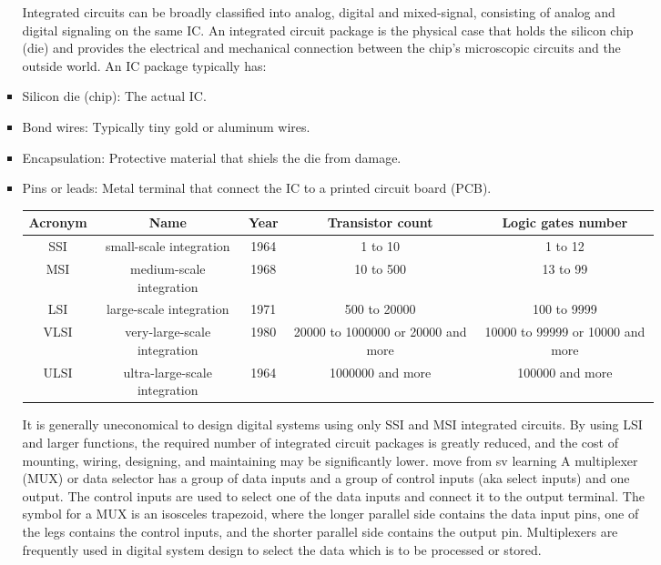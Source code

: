 \documentclass[a4paper,12pt]{article}
\begin{document}
\begin{itemize}
\begin{itemize}
\begin{itemize}
\begin{itemize}
\begin{itemize}
\begin{itemize}
\begin{itemize}
Integrated circuits can be broadly classified into analog, digital and mixed-signal, consisting of analog and digital signaling on the same IC.
An integrated circuit package is the physical case that holds the silicon chip (die) and provides the electrical and mechanical connection between the chip’s microscopic circuits and the outside world. An IC package typically has:
\bit
\item Silicon die (chip): The actual IC.
\item Bond wires: Typically tiny gold or aluminum wires.
\item Encapsulation: Protective material that shiels the die from damage.
\item Pins or leads: Metal terminal that connect the IC to a printed circuit board (PCB).
\eit
{}
\begin{longtable}[c]{|c|c|c|c|c|}
    \hline
    Acronym & Name & Year & Transistor count & Logic gates number \\\hline
    SSI & small-scale integration & 1964 & 1 to 10 & 1 to 12 \\\hline
    MSI & medium-scale integration & 1968 & 10 to 500 & 13 to 99 \\\hline
    LSI & large-scale integration & 1971 & 500 to 20000 & 100 to 9999 \\\hline
    VLSI & very-large-scale integration & 1980 & 20000 to 1000000 or 20000 and more & 10000 to 99999 or 10000 and more \\\hline
    ULSI & ultra-large-scale integration & 1964 & 1000000 and more & 100000 and more \\\hline
\end{longtable}

It is generally uneconomical to design digital systems using only SSI and MSI integrated circuits. By using LSI and larger functions, the required number of integrated circuit packages is greatly reduced, and the cost of mounting, wiring, designing, and maintaining may be significantly lower.
move from sv learning
A multiplexer (MUX) or data selector has a group of data inputs and a group of control inputs (aka select inputs) and one output. The control inputs are used to select one of the data inputs and connect it to the output terminal. The symbol for a MUX is an isosceles trapezoid, where the longer parallel side contains the data input pins, one of the legs contains the control inputs, and the shorter parallel side contains the output pin. Multiplexers are frequently used in digital system design to select the data which is to be processed or stored.


\end{itemize}
\end{itemize}
\end{itemize}
\end{itemize}
\end{itemize}
\end{itemize}
\end{itemize}
\end{document}

